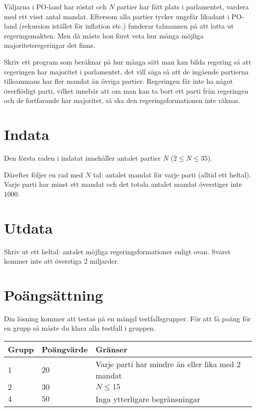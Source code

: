 
Väljarna i PO-land har röstat och $N$ partier har fått plats i parlamentet, vardera med ett
visst antal mandat. Eftersom alla partier tycker ungefär likadant i PO-land (rekursion
istället för inflation etc.) funderar talmannen på att lotta ut regeringsmakten. Men då
måste hon först veta hur många möjliga majoritetsregeringar det finns.

Skriv ett program som beräknar på hur många sätt man kan bilda regering så att regeringen
har majoritet i parlamentet, det vill säga så att de ingående partierna tillsammans har
fler mandat än övriga partier. Regeringen får inte ha något överflödigt parti, vilket innebär
att om man kan ta bort ett parti från regeringen och de fortfarande har majoritet,
så ska den regeringsformationen inte räknas.

\section*{Indata}

Den första raden i indatat innehåller antalet partier $N$ ($2 \leq N \leq 35$).

Därefter följer en rad med $N$ tal: antalet mandat för varje parti (alltid ett heltal).
Varje parti har minst ett mandat och det totala antalet mandat överstiger inte $1000$.

\section*{Utdata}

Skriv ut ett heltal: antalet möjliga regeringsformationer enligt ovan.
Svaret kommer inte att överstiga 2 miljarder.

\section*{Poängsättning}
Din lösning kommer att testas på en mängd testfallsgrupper.
För att få poäng för en grupp så måste du klara alla testfall i gruppen.

\noindent
\begin{tabular}{| l | l | p{12cm} |}
  \hline
  Grupp & Poängvärde & Gränser \\ \hline
  $1$   & $20$       & Varje parti har mindre än eller lika med $2$ mandat \\ \hline
  $2$   & $30$       & $N \leq 15$ \\ \hline
  $4$   & $50$       & Inga ytterligare begränsningar  \\ \hline
\end{tabular}